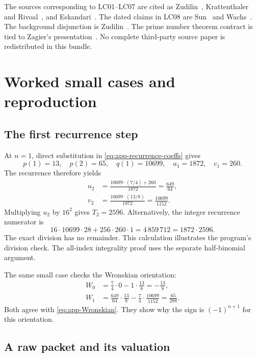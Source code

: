 The sources corresponding to LC01--LC07 are cited as Zudilin~\cite{Zudilin2003,Zudilin2002}, Krattenthaler and Rivoal~\cite{KR2008}, and Eskandari~\cite{Eskandari2026}. The dated claims in LC08 are Sun~\cite{Sun2026} and Wachs~\cite{Wachs2026}. The background disjunction is Zudilin~\cite{Zudilin2019}. The prime number theorem contract is tied to Zagier's presentation~\cite{Zagier1997}. No complete third-party source paper is redistributed in this bundle.

\chapter{Worked small cases and reproduction}
\label{app:worked-reproduction}

\section{The first recurrence step}

At $n=1$, direct substitution in \eqref{eq:app-recurrence-coeffs} gives
\begin{equation*}
 p(1)=13,\quad p(2)=65,\quad q(1)=10699,
 \quad a_1=1872,\quad c_1=260.
\end{equation*}
The recurrence therefore yields
\begin{align*}
 u_2&=\frac{10699\cdot(7/4)+260}{1872}
 =\frac{649}{64},\\
 v_2&=\frac{10699\cdot(13/8)}{1872}
 =\frac{10699}{1152}.
\end{align*}
Multiplying $u_2$ by $16^2$ gives $T_2=2596$. Alternatively, the integer recurrence numerator is
\begin{equation*}
 16\cdot10699\cdot28+256\cdot260\cdot1
 =4\,859\,712=1872\cdot2596.
\end{equation*}
The exact division has no remainder. This calculation illustrates the program's division check. The all-index integrality proof uses the separate half-binomial argument.

The same small case checks the Wronskian orientation:
\begin{align*}
 W_0&=\frac74\cdot0-1\cdot\frac{13}{8}
 =-\frac{13}{8},\\
 W_1&=\frac{649}{64}\cdot\frac{13}{8}
 -\frac74\cdot\frac{10699}{1152}
 =\frac{65}{288}.
\end{align*}
Both agree with \eqref{eq:app-Wronskian}. They show why the sign is $(-1)^{n+1}$ for this orientation.

\section{A raw packet and its valuation}

